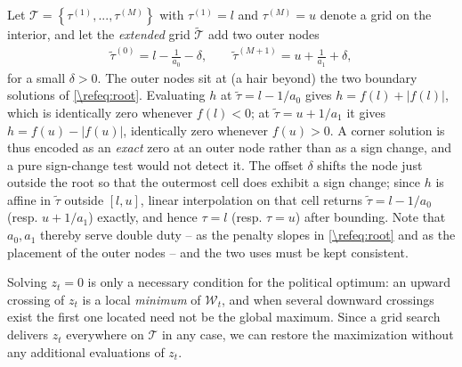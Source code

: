 \documentclass[a4paper]{article}
\begin{document}
Let $\mathcal{T} = \left\lbrace \tau^{(1)},...,\tau^{(M)}\right\rbrace$ with $\tau^{(1)} = l$ and $\tau^{(M)} = u$ denote a grid on the interior, and let the \emph{extended} grid $\tilde{\mathcal{T}}$ add two outer nodes
\begin{align}\label{\refeq:extendedGrid}
    \tilde{\tau}^{(0)} = l-\frac{1}{a_0}-\delta, \qquad \tilde{\tau}^{(M+1)} = u+\frac{1}{a_1}+\delta,
\end{align}
for a small $\delta>0$. The outer nodes sit at (a hair beyond) the two boundary solutions of \eqref{\refeq:root}. Evaluating $h$ at $\tilde{\tau} = l-1/a_0$ gives $h = f(l)+\left|f(l)\right|$, which is identically zero whenever $f(l)<0$; at $\tilde{\tau} = u+1/a_1$ it gives $h = f(u)-\left|f(u)\right|$, identically zero whenever $f(u)>0$. A corner solution is thus encoded as an \emph{exact} zero at an outer node rather than as a sign change, and a pure sign-change test would not detect it. The offset $\delta$ shifts the node just outside the root so that the outermost cell does exhibit a sign change; since $h$ is affine in $\tilde\tau$ outside $[l,u]$, linear interpolation on that cell returns $\tilde\tau = l-1/a_0$ (resp. $u+1/a_1$) exactly, and hence $\tau = l$ (resp. $\tau = u$) after bounding. Note that $a_0, a_1$ thereby serve double duty -- as the penalty slopes in \eqref{\refeq:root} and as the placement of the outer nodes -- and the two uses must be kept consistent.

Solving $z_t = 0$ is only a necessary condition for the political optimum: an upward crossing of $z_t$ is a local \emph{minimum} of $\mathcal{W}_t$, and when several downward crossings exist the first one located need not be the global maximum. Since a grid search delivers $z_t$ everywhere on $\mathcal{T}$ in any case, we can restore the maximization without any additional evaluations of $z_t$.
\end{document}
